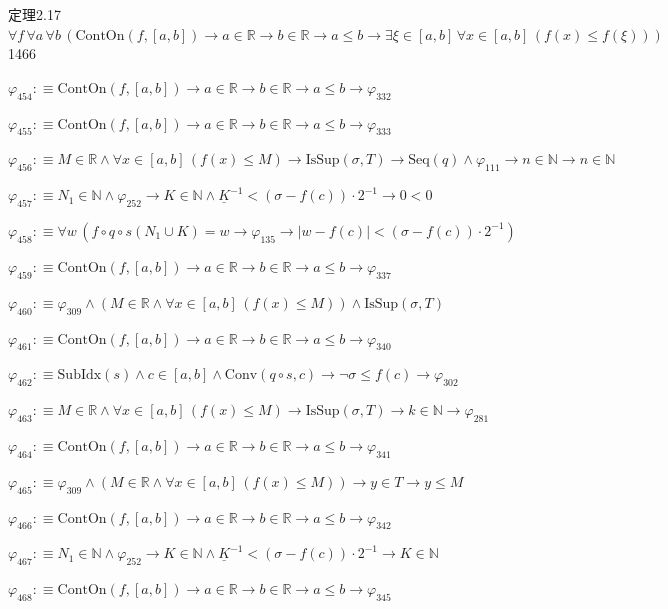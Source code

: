 \begin{fullproof}{定理2.17}{$\forall f\,\forall a\,\forall b\,(\mathrm{ContOn}(f,[a,b]) \to a \in \mathbb{R} \to b \in \mathbb{R} \to a \leq b \to \exists \xi \in [a,b]\,\forall x \in [a,b]\,(f(x) \leq f(\xi)))$}{1466}
\begin{abbrevlist}
\item $\varphi_{454} :\equiv \mathrm{ContOn}(f,[a,b]) \to a \in \mathbb{R} \to b \in \mathbb{R} \to a \leq b \to \varphi_{332}$
\item $\varphi_{455} :\equiv \mathrm{ContOn}(f,[a,b]) \to a \in \mathbb{R} \to b \in \mathbb{R} \to a \leq b \to \varphi_{333}$
\item $\varphi_{456} :\equiv M \in \mathbb{R} \land \forall x \in [a,b]\,(f(x) \leq M) \to \mathrm{IsSup}(\sigma,T) \to \mathrm{Seq}(q) \land \varphi_{111} \to n \in \mathbb{N} \to n \in \mathbb{N}$
\item $\varphi_{457} :\equiv N_{1} \in \mathbb{N} \land \varphi_{252} \to K \in \mathbb{N} \land \underline{K}^{-1} < (\sigma - f(c)) \cdot 2^{-1} \to 0 < 0$
\item $\varphi_{458} :\equiv \forall w\,(f \circ q \circ s(N_{1} \cup K) = w \to \varphi_{135} \to \lvert w - f(c) \rvert < (\sigma - f(c)) \cdot 2^{-1})$
\item $\varphi_{459} :\equiv \mathrm{ContOn}(f,[a,b]) \to a \in \mathbb{R} \to b \in \mathbb{R} \to a \leq b \to \varphi_{337}$
\item $\varphi_{460} :\equiv \varphi_{309} \land (M \in \mathbb{R} \land \forall x \in [a,b]\,(f(x) \leq M)) \land \mathrm{IsSup}(\sigma,T)$
\item $\varphi_{461} :\equiv \mathrm{ContOn}(f,[a,b]) \to a \in \mathbb{R} \to b \in \mathbb{R} \to a \leq b \to \varphi_{340}$
\item $\varphi_{462} :\equiv \mathrm{SubIdx}(s) \land c \in [a,b] \land \mathrm{Conv}(q \circ s,c) \to \neg \sigma \leq f(c) \to \varphi_{302}$
\item $\varphi_{463} :\equiv M \in \mathbb{R} \land \forall x \in [a,b]\,(f(x) \leq M) \to \mathrm{IsSup}(\sigma,T) \to k \in \mathbb{N} \to \varphi_{281}$
\item $\varphi_{464} :\equiv \mathrm{ContOn}(f,[a,b]) \to a \in \mathbb{R} \to b \in \mathbb{R} \to a \leq b \to \varphi_{341}$
\item $\varphi_{465} :\equiv \varphi_{309} \land (M \in \mathbb{R} \land \forall x \in [a,b]\,(f(x) \leq M)) \to y \in T \to y \leq M$
\item $\varphi_{466} :\equiv \mathrm{ContOn}(f,[a,b]) \to a \in \mathbb{R} \to b \in \mathbb{R} \to a \leq b \to \varphi_{342}$
\item $\varphi_{467} :\equiv N_{1} \in \mathbb{N} \land \varphi_{252} \to K \in \mathbb{N} \land \underline{K}^{-1} < (\sigma - f(c)) \cdot 2^{-1} \to K \in \mathbb{N}$
\item $\varphi_{468} :\equiv \mathrm{ContOn}(f,[a,b]) \to a \in \mathbb{R} \to b \in \mathbb{R} \to a \leq b \to \varphi_{345}$

\end{abbrevlist}
\end{fullproof}
